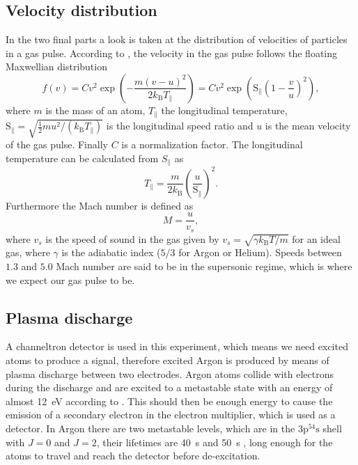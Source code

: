 \documentclass[a4paper,10pt]{article}
\begin{document}
\subsection{Velocity distribution}\label{theory}
In the two final parts a look is taken at the distribution of velocities of particles in a gas pulse. According to \cite{bergmann}, the velocity in the gas pulse follows the floating Maxwellian distribution 
\begin{equation}\label{floatmaxwell}
	f(v) = C v^2 \exp(- \frac{m (v - u)^2}{2 k_\mathrm{B} T_\parallel}) = C v^2 \exp(\mathrm{S}_\parallel \left(1 - \frac{v}{u}\right)^2),
\end{equation}
where $m$ is the mass of an atom, $T_\parallel$ the longitudinal temperature, $\mathrm{S}_\parallel = \sqrt{\frac{1}{2} m u^2 / (k_{\mathrm{B}} T_\parallel)}$ is the longitudinal speed ratio and $u$ is the mean velocity of the gas pulse. Finally $C$ is a normalization factor. The longitudinal temperature can be calculated from $S_\parallel$  as
\begin{equation}
T_\parallel = \frac{m}{2 k_\mathrm{B}} \left(\frac{u}{\mathrm{S}_\parallel} \right)^2.
\end{equation}
Furthermore the Mach number is defined as 
\[ M = \frac{u}{v_s},\]
where $v_s$ is the speed of sound in the gas given by $v_s = \sqrt{\gamma k_\mathrm{B} T/m}$ for an ideal gas, where $\gamma$ is the adiabatic index ($5/3$ for Argon or Helium). Speeds between $1.3$ and $5.0$ Mach number are said to be in the supersonic regime, which is where we expect our gas pulse to be.

\subsection{Plasma discharge}
A channeltron detector is used in this experiment, which means we need excited atoms to produce a signal, therefore excited Argon is produced by means of plasma discharge between two electrodes. Argon atoms collide with electrons during the discharge and are excited to a metastable state with an energy of almost \SI{12}{\electronvolt} according to \cite{script}. This should then be enough energy to cause the emission of a secondary electron in the electron multiplier, which is used as a detector. In Argon there are two metastable levels, which are in the $3\text{p}^54\text{s}$ shell with $J=0$ and $J = 2$, their lifetimes are \SI{40}{\s} and \SI{50}{\s} \cite{lifetime}, long enough for the atoms to travel and reach the detector before de-excitation. 
\end{document}
